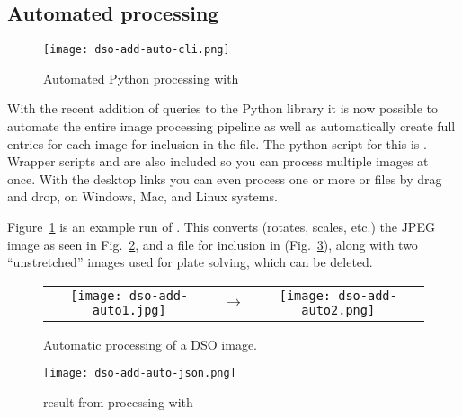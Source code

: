 \subsection{Automated processing}
\label{sec:dso:adding_images:auto}

\begin{figure}[tbp]
\centering\texttt{[image: dso-add-auto-cli.png]}
\caption{Automated Python processing with }
\label{fig:dso:adding_images:auto}
\end{figure}

With the recent addition of  queries to the
Python  library it is now possible to automate
the entire image processing pipeline as well as automatically create
full  entries for each image for inclusion in the
 file. The python script for this is
. Wrapper scripts
 and
 are also included so you
can process multiple images at once. With the desktop links you can even
process one or more  or  files by drag and
drop, on Windows, Mac, and Linux systems.

Figure~\ref{fig:dso:adding_images:auto} is an example run of
.  This converts
(rotates, scales, etc.) the JPEG image as seen in
Fig.~\ref{fig:dso:adding_images:auto-result}, and a  file
for inclusion in 
(Fig.~\ref{fig:dso:adding_images:auto-json}), along with two
``unstretched''  images used for plate solving,
which can be deleted.

\begin{figure}[htbp]
  \centering
  \begin{tabular}{ccc}
    \texttt{[image: dso-add-auto1.jpg]}&$\rightarrow$&
    \texttt{[image: dso-add-auto2.png]}
  \end{tabular}
  \caption{Automatic processing of a DSO image.}
  \label{fig:dso:adding_images:auto-result}
\end{figure}
\begin{figure}[htbp]
\centering\texttt{[image: dso-add-auto-json.png]}
\caption{ result from processing with }
\label{fig:dso:adding_images:auto-json}
\end{figure}

